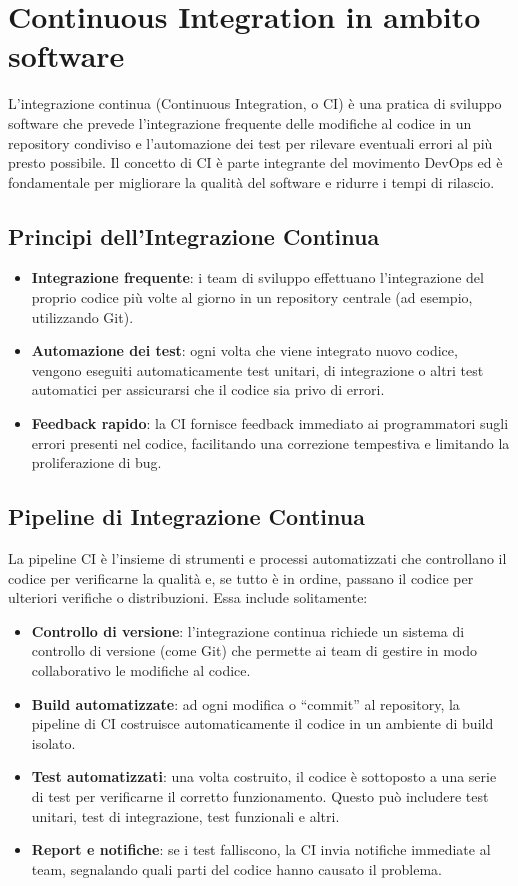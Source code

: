\documentclass{article}
\begin{document}
\section*{Continuous Integration in ambito software}

L’integrazione continua (Continuous Integration, o CI) è una pratica di sviluppo software che prevede l'integrazione frequente delle modifiche al codice in un repository condiviso e l'automazione dei test per rilevare eventuali errori al più presto possibile. Il concetto di CI è parte integrante del movimento DevOps ed è fondamentale per migliorare la qualità del software e ridurre i tempi di rilascio.

\subsection*{Principi dell'Integrazione Continua}
\begin{itemize}
    \item \textbf{Integrazione frequente}: i team di sviluppo effettuano l'integrazione del proprio codice più volte al giorno in un repository centrale (ad esempio, utilizzando Git).
    \item \textbf{Automazione dei test}: ogni volta che viene integrato nuovo codice, vengono eseguiti automaticamente test unitari, di integrazione o altri test automatici per assicurarsi che il codice sia privo di errori.
    \item \textbf{Feedback rapido}: la CI fornisce feedback immediato ai programmatori sugli errori presenti nel codice, facilitando una correzione tempestiva e limitando la proliferazione di bug.
\end{itemize}

\subsection*{Pipeline di Integrazione Continua}
La pipeline CI è l’insieme di strumenti e processi automatizzati che controllano il codice per verificarne la qualità e, se tutto è in ordine, passano il codice per ulteriori verifiche o distribuzioni. Essa include solitamente:
\begin{itemize}
    \item \textbf{Controllo di versione}: l'integrazione continua richiede un sistema di controllo di versione (come Git) che permette ai team di gestire in modo collaborativo le modifiche al codice.
    \item \textbf{Build automatizzate}: ad ogni modifica o “commit” al repository, la pipeline di CI costruisce automaticamente il codice in un ambiente di build isolato.
    \item \textbf{Test automatizzati}: una volta costruito, il codice è sottoposto a una serie di test per verificarne il corretto funzionamento. Questo può includere test unitari, test di integrazione, test funzionali e altri.
    \item \textbf{Report e notifiche}: se i test falliscono, la CI invia notifiche immediate al team, segnalando quali parti del codice hanno causato il problema.
\end{itemize}
\end{document}

